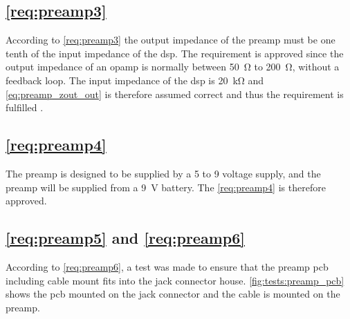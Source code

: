 %
%

\subsection{\autoref{req:preamp3}}
According to \autoref{req:preamp3} the output impedance of the preamp must be one tenth of the input impedance of the \gls{dsp}. The requirement is approved since the output impedance of an \gls{opamp} is normally between \SI{50}{\ohm} to \SI{200}{\ohm}, without a feedback loop. The input impedance of the \gls{dsp} is \SI{20}{\kilo\ohm} and \autoref{eq:preamp_zout_out} is therefore assumed correct and thus the requirement is fulfilled \citep{TLV320AIC3204}.  

\subsection{\autoref{req:preamp4}}
The \gls{preamp} is designed to be supplied by a 5 to 9 voltage supply, and the \gls{preamp} will be supplied from a \SI{9}{\volt} battery. The \autoref{req:preamp4} is therefore approved.

\subsection{\autoref{req:preamp5} and \autoref{req:preamp6}}
According to \autoref{req:preamp6}, a test was made to ensure that the \gls{preamp} \gls{pcb} including cable mount fits into the jack connector house. \autoref{fig:tests:preamp_pcb} shows the \gls{pcb} mounted on the jack connector and the cable is mounted on the \gls{preamp}. 

